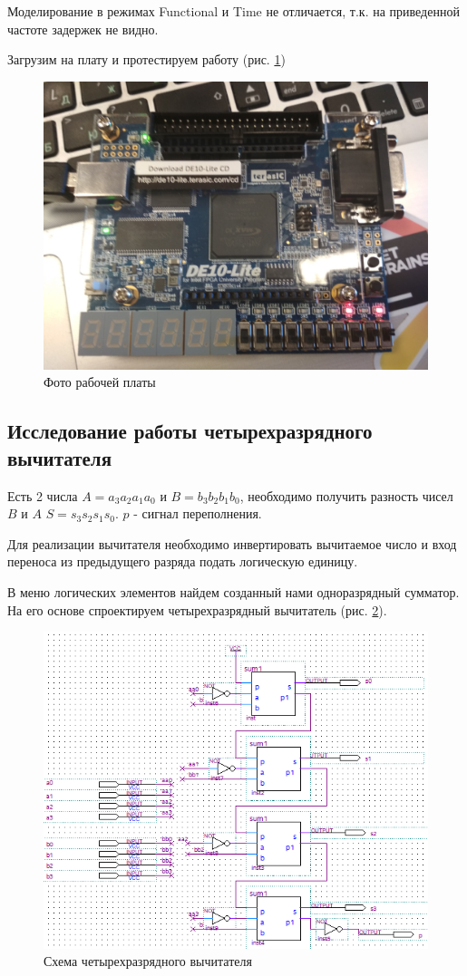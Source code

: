 \documentclass[a4paper,14pt]{article}
\begin{document}
Моделирование в режимах Functional и Time не отличается, т.к. на приведенной частоте задержек не видно.

Загрузим на плату и протестируем работу (рис. \ref{fig:044foto})

\begin{figure}[H]
	\centering
	\includegraphics[width=0.7\linewidth]{image/lab4/2020-03-1412-17-14.JPG}
	\caption{Фото рабочей платы}
	\label{fig:044foto}
\end{figure}

\subsection{Исследование работы четырехразрядного вычитателя}

Есть 2 числа $A = a_3a_2a_1a_0$ и $B = b_3b_2b_1b_0$, необходимо получить разность чисел $B$ и $A$ $S = s_3s_2s_1s_0$. $p$ - сигнал переполнения.

Для реализации вычитателя необходимо инвертировать вычитаемое число и вход переноса из предыдущего разряда подать логическую единицу.

В меню логических элементов найдем созданный нами одноразрядный сумматор. На его основе спроектируем четырехразрядный вычитатель (рис. \ref{fig:044vicbdf}).

\begin{figure}[H]
	\centering
	\includegraphics[width=0.7\linewidth]{image/lab4/04_4vic_bdf}
	\caption{Схема четырехразрядного вычитателя}
	\label{fig:044vicbdf}
\end{figure}
\end{document}
